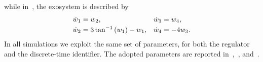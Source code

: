 while in~, the exosystem is described by
\begin{equation}%
   \label{EQ:OR-POSTP-EXOSYSTEM-3}
   \begin{matrix}
      \begin{split}
         \dot{\ww}_1 & = \ww_2, \\
         \dot{\ww}_2 & = 3\tan^{-1}\lp \ww_1\rp - \ww_1, \\
      \end{split} &
      \begin{split}
         \dot{\ww}_3 & = \ww_4, \\
         \dot{\ww}_4 & = -4\ww_3.
      \end{split}
   \end{matrix}
\end{equation}
In all simulations we exploit the same set of parameters, for both the regulator and the discrete-time identifier.
The adopted parameters are reported in~,~, and~.

